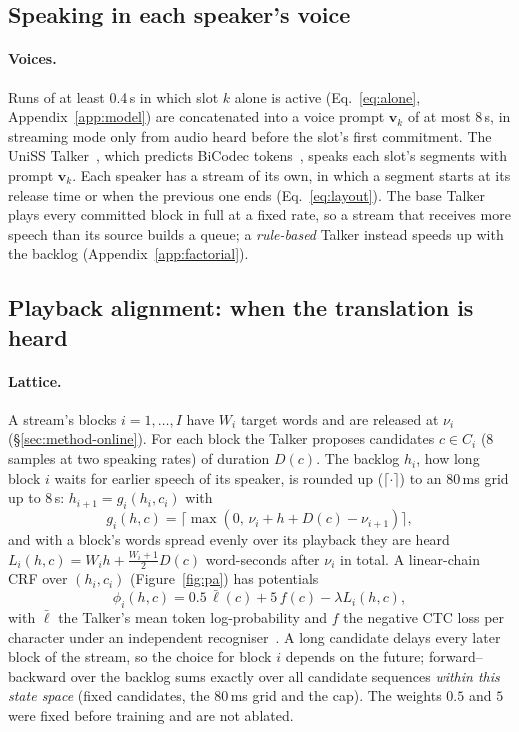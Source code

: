 \subsection{Speaking in each speaker's voice}
\label{sec:method-voice}

\paragraph{Voices.} Runs of at least 0.4\,s in which slot $k$ alone is active (Eq.~\eqref{eq:alone},
Appendix~\ref{app:model}) are concatenated into a voice prompt $\bm{v}_k$ of at most 8\,s, in streaming mode only from
audio heard before the slot's first commitment. The UniSS Talker~\citep{uniss2025}, which predicts BiCodec
tokens~\citep{wang2025spark}, speaks each slot's segments with prompt $\bm{v}_k$. Each speaker has a stream of its own,
in which a segment starts at its release time or when the previous one ends (Eq.~\eqref{eq:layout}). The base Talker
plays every committed block in full at a fixed rate, so a stream that receives more speech than its source builds a
queue; a \emph{rule-based} Talker instead speeds up with the backlog\ifFactorial{} (Appendix~\ref{app:factorial})\fi.

\subsection{Playback alignment: when the translation is heard}
\label{sec:method-plem}



\paragraph{Lattice.} A stream's blocks $i=1,\dots,I$ have $W_i$ target words and are released at $\nu_i$
(\S\ref{sec:method-online}). For each block the Talker proposes candidates $c\in C_i$ (8 samples at two speaking rates)
of duration $D(c)$. The backlog $h_i$, how long block $i$ waits for earlier speech of its speaker, is rounded up
($\lceil\cdot\rceil$) to an 80\,ms grid up to 8\,s: $h_{i+1}=g_i(h_i,c_i)$ with
\begin{equation}
g_i(h,c)=\big\lceil\max(0,\,\nu_i+h+D(c)-\nu_{i+1})\big\rceil,
\label{eq:backlog}
\end{equation}
and with a block's words spread evenly over its playback they are heard $L_i(h,c)=W_ih+\tfrac{W_i+1}{2}D(c)$
word-seconds after $\nu_i$ in total. A linear-chain CRF over $(h_i,c_i)$ (Figure~\ref{fig:pa}) has potentials
\begin{equation}
\phi_i(h,c)=0.5\,\bar{\ell}(c)+5\,f(c)-\lambda L_i(h,c),
\label{eq:plpot}
\end{equation}
with $\bar{\ell}$ the Talker's mean token log-probability and $f$ the negative CTC loss per character under an
independent recogniser~\citep{baevski2020wav2vec}. A long candidate delays every later block of the stream, so the choice for block $i$
depends on the future; forward--backward over the backlog sums exactly over all candidate sequences \emph{within this
state space} (fixed candidates, the 80\,ms grid and the cap). The weights $0.5$ and $5$ were fixed before training and
are not ablated.

